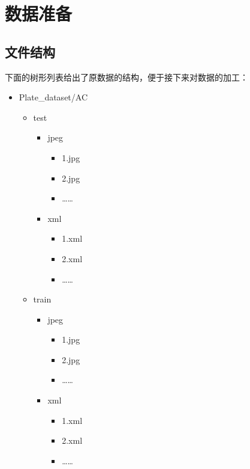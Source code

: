 \documentclass[UTF8]{article}
\title{\insertsubject}
\author{李沿橙 1900012766}
\date{\today}
\begin{document}
	\maketitle

	\section{数据准备}

	\subsection{文件结构}

	下面的树形列表给出了原数据的结构，便于接下来对数据的加工：

	\begin{multicols}{2}
	\begin{itemize}
		\item Plate\_dataset/AC
		\begin{itemize}
			\item test
			\begin{itemize}
				\item jpeg
				\begin{itemize}
					\item 1.jpg
					\item 2.jpg
					\item ……
				\end{itemize}
				\item xml
				\begin{itemize}
					\item 1.xml
					\item 2.xml
					\item ……
				\end{itemize}
			\end{itemize}
			\item train
			\begin{itemize}
				\item jpeg
				\begin{itemize}
					\item 1.jpg
					\item 2.jpg
					\item ……
				\end{itemize}
				\item xml
				\begin{itemize}
					\item 1.xml
					\item 2.xml
					\item ……
				\end{itemize}

\end{itemize}
\end{itemize}
\end{itemize}
\end{multicols}
\end{document}
